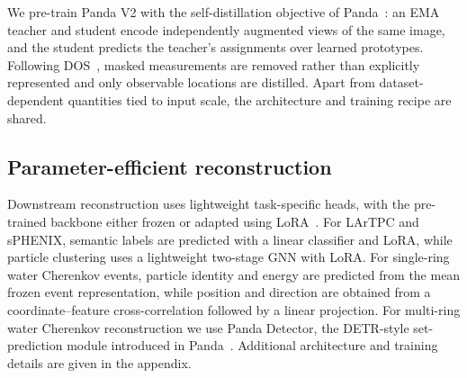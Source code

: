 We pre-train Panda V2 with the self-distillation objective of Panda~\citep{panda}: an EMA teacher and student encode independently augmented views of the same image, and the student predicts the teacher's assignments over learned prototypes. Following DOS~\citep{dos}, masked measurements are removed rather than explicitly represented and only observable locations are distilled. Apart from dataset-dependent quantities tied to input scale, the architecture and training recipe are shared.

\subsection{Parameter-efficient reconstruction}
\label{sec:reconstruction}

Downstream reconstruction uses lightweight task-specific heads, with the pre-trained backbone either frozen or adapted using LoRA~\citep{lora}. For LArTPC and sPHENIX, semantic labels are predicted with a linear classifier and LoRA, while particle clustering uses a lightweight two-stage GNN with LoRA. For single-ring water Cherenkov events, particle identity and energy are predicted from the mean frozen event representation, while position and direction are obtained from a coordinate--feature cross-correlation followed by a linear projection. For multi-ring water Cherenkov reconstruction we use Panda Detector, the DETR-style set-prediction module introduced in Panda~\citep{panda}. Additional architecture and training details are given in the appendix.
